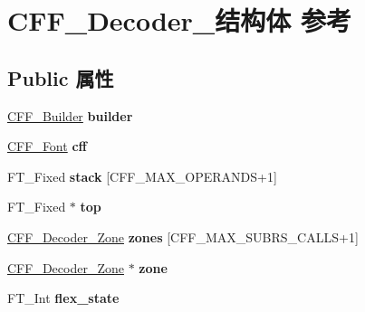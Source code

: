 \hypertarget{struct_c_f_f___decoder__}{}\section{C\+F\+F\+\_\+\+Decoder\+\_\+结构体 参考}
\label{struct_c_f_f___decoder__}
\subsection*{Public 属性}
\begin{DoxyCompactItemize}
\item 
\mbox{\label{struct_c_f_f___decoder___a1974266e7e164100b88c75fc05a15303}} 
\hyperlink{struct_c_f_f___builder__}{C\+F\+F\+\_\+\+Builder} {\bfseries builder}
\item 
\mbox{\label{struct_c_f_f___decoder___a543fe100eb6139211d33c57bc82c9faa}} 
\hyperlink{struct_c_f_f___font_rec__}{C\+F\+F\+\_\+\+Font} {\bfseries cff}
\item 
\mbox{\label{struct_c_f_f___decoder___afb0aead2fa8dcd179609394ce435007e}} 
F\+T\+\_\+\+Fixed {\bfseries stack} \mbox{[}C\+F\+F\+\_\+\+M\+A\+X\+\_\+\+O\+P\+E\+R\+A\+N\+DS+1\mbox{]}
\item 
\mbox{\label{struct_c_f_f___decoder___a3629bf05291a538fd649abab0848a39c}} 
F\+T\+\_\+\+Fixed $\ast$ {\bfseries top}
\item 
\mbox{\label{struct_c_f_f___decoder___a91ff8b4f9cb5d2275cc468972632aaac}} 
\hyperlink{struct_c_f_f___decoder___zone__}{C\+F\+F\+\_\+\+Decoder\+\_\+\+Zone} {\bfseries zones} \mbox{[}C\+F\+F\+\_\+\+M\+A\+X\+\_\+\+S\+U\+B\+R\+S\+\_\+\+C\+A\+L\+LS+1\mbox{]}
\item 
\mbox{\label{struct_c_f_f___decoder___a8b7e65540295938e9c3f466f8279849c}} 
\hyperlink{struct_c_f_f___decoder___zone__}{C\+F\+F\+\_\+\+Decoder\+\_\+\+Zone} $\ast$ {\bfseries zone}
\item 
\mbox{\label{struct_c_f_f___decoder___a2a6a5d625f137a69d839ffe9570e7b61}} 
F\+T\+\_\+\+Int {\bfseries flex\+\_\+state}
\item 

\end{DoxyCompactItemize}
